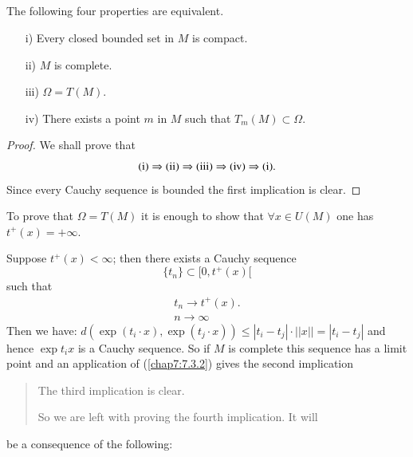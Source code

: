 \subsection{}\label{chap7:7.4.3}

\begin{theorem}
The following four properties are equivalent.
\begin{itemize}
\item[\rm i)] Every closed bounded set in $M$ is compact.

\item[\rm ii)] $M$ is complete.

\item[\rm iii)] $\Omega=T(M)$.

\item[\rm iv)] There exists a point $m$ in $M$ such that
  $T_{m}(M)\subset \Omega$.
\end{itemize}
\end{theorem}

\begin{proof}
We shall prove that
$$
{\rm (i) }\Rightarrow {\rm (ii) } \Rightarrow {\rm (iii) } \Rightarrow
{\rm (iv) }\Rightarrow {\rm (i)}.
$$
Since every Cauchy sequence is bounded the first implication is clear.
\end{proof}

To prove that $\Omega=T(M)$ it is enough to show that $\forall x\in
U(M)$ one has $t^{+}(x)=+\infty$.

Suppose $t^{+}(x)<\infty$; then there exists a Cauchy sequence
$$
\{t_{n}\}\subset [0,t^{+}(x)[
$$
such that\pageoriginale
\begin{gather*}
t_{n}\to t^{+}(x).\\
n\to \infty
\end{gather*}
Then we have: $d(\exp(t_{i}\cdot x),\exp(t_{j}\cdot x))\leq
|t_{i}-t_{j}|\cdot ||x||=|t_{i}-t_{j}|$ and hence $\exp t_{i}x$ is a
Cauchy sequence. So if $M$ is complete this sequence has a limit point
and an application of (\ref{chap7:7.3.2}) gives the second implication
\begin{quote}
The third implication is clear.

So we are left with proving the fourth implication. It will
\end{quote}
be a consequence of the following:

\subsection{}\label{chap7:prop7.4.4}

